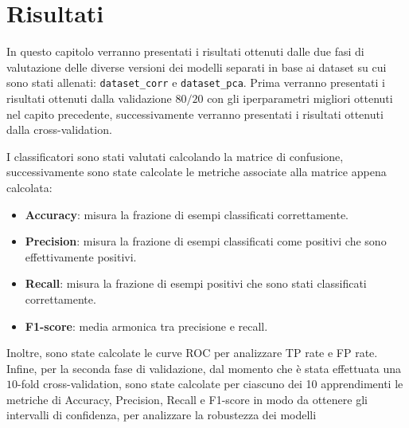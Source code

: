 \chapter{Risultati} \label{chp:risultati}
In questo capitolo verranno presentati i risultati ottenuti dalle due fasi di valutazione
delle diverse versioni dei modelli separati in base ai dataset su cui sono stati 
allenati: \texttt{dataset\_corr} e \texttt{dataset\_pca}. Prima verranno presentati
i risultati ottenuti dalla validazione $80/20$ con gli iperparametri migliori 
ottenuti nel capito precedente, successivamente verranno presentati
i risultati ottenuti dalla cross-validation.



I classificatori sono stati valutati calcolando la matrice di confusione, successivamente
sono state calcolate le metriche associate alla matrice appena calcolata:
\begin{itemize}
    \item \textbf{Accuracy}: misura la frazione di esempi classificati correttamente.
    \item \textbf{Precision}: misura la frazione di esempi classificati come
          positivi che sono effettivamente positivi.
    \item \textbf{Recall}: misura la frazione di esempi positivi che sono stati
          classificati correttamente.
    \item \textbf{F1-score}: media armonica tra precisione e recall.
\end{itemize}
Inoltre, sono state calcolate le curve ROC per analizzare TP rate e FP rate.
Infine, per la seconda fase di validazione, dal momento che è stata effettuata una 
$10$-fold cross-validation, sono state calcolate per ciascuno dei 10 apprendimenti
le metriche di Accuracy, Precision, Recall e F1-score in modo da ottenere gli 
intervalli di confidenza, per analizzare la robustezza dei modelli 

